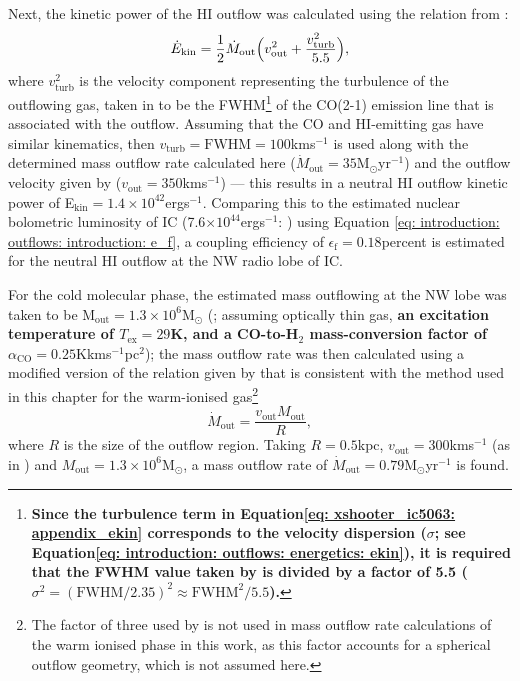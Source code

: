 Next, the kinetic power of the HI outflow was calculated using the relation from \citet{Morganti2015}:
\begin{equation}
    \dot{E}_\mathrm{kin} = \frac{1}{2}\dot{M}_\mathrm{out}\Bigl(v^2_\mathrm{out}+\frac{v^2_\mathrm{turb}}{5.5}\Bigr),
\label{eq: xshooter_ic5063: appendix_ekin}
\end{equation}
where $v^2_\mathrm{turb}$ is the velocity component representing the turbulence of the outflowing gas, taken in \citet{Morganti2015} to be the FWHM\footnote{\textbf{Since the turbulence term in Equation\;\ref{eq: xshooter_ic5063: appendix_ekin} corresponds to the velocity dispersion ($\sigma$; see Equation\;\ref{eq: introduction: outflows: energetics: ekin}), it is required that the FWHM value taken by \citet{Morganti2015} is divided by a factor of 5.5 ($\sigma^2=(\mathrm{FWHM}/2.35)^2\approx\mathrm{FWHM}^2/5.5$).}} of the CO(2-1) emission line that is associated with the outflow. Assuming that the CO and HI-emitting gas have similar kinematics, then $v_\mathrm{turb}=\mathrm{FWHM}=100$\;km\;s$^{-1}$ \citep{Morganti2015} is used along with the determined mass outflow rate calculated here ($\dot{M}_\mathrm{out}=35$\;M$_\odot$\;yr$^{-1}$) and the outflow velocity given by \citet{Morganti2005} ($v_\mathrm{out}=350$\;km\;s$^{-1}$) --- this results in a neutral HI outflow kinetic power of \mbox{E$_\mathrm{kin}=1.4\times10^{42}$\;erg\;s$^{-1}$}. Comparing this to the estimated nuclear bolometric luminosity of IC (7.6$\times10^{44}$\;erg\;s$^{-1}$: \citealt{Nicastro2003, Morganti2007}) using Equation \ref{eq: introduction: outflows: introduction: e_f}, a coupling efficiency of $\epsilon_\mathrm{f}=0.18$\;per\;cent is estimated for the neutral HI outflow at the NW radio lobe of IC.

For the cold molecular phase, the estimated mass outflowing at the NW lobe was taken to be \mbox{M$_\mathrm{out}=1.3\times10^{6}$\;M$_\odot$} (\citealt{Oosterloo2017}; assuming optically thin gas, \textbf{an excitation temperature of $T_\mathrm{ex}=29$\;K, and a CO-to-H$_\mathrm{2}$ mass-conversion factor of} $\alpha_\mathrm{CO} =
0.25$\;K\;km\;s$^{-1}$\;pc$^2$); the mass outflow rate was then calculated using a modified version of the relation given by \citet{Oosterloo2017} that is consistent with the method used in this chapter for the warm-ionised gas\footnote{The factor of three used by \citet{Oosterloo2017} is not used in mass outflow rate calculations of the warm ionised phase in this work, as this factor accounts for a spherical outflow geometry, which is not assumed here.}
\begin{equation}
    \dot{M}_\mathrm{out}=\frac{v_\mathrm{out}M_\mathrm{out}}{R},
\end{equation}
where $R$ is the size of the outflow region. Taking $R=0.5$\;kpc, $v_\mathrm{out}=300$\;km\;s$^{-1}$ (as in \citealt{Oosterloo2017}) and \mbox{$M_\mathrm{out}=1.3\times10^{6}$\;M$_\odot$}, a mass outflow rate of \mbox{$\dot{M}_\mathrm{out}=0.79$\;M$_\odot$\;yr$^{-1}$} is found.

